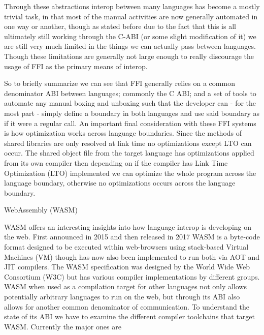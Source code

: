 Through these abstractions interop between many languages has become a mostly trivial task, in that most of the manual activities are now generally automated in one way or another, though as stated before due to the fact that this is all ultimately still working through the C-ABI (or some slight modification of it) we are still very much limited in the things we can actually pass between languages. Though these limitations are generally not large enough to really discourage the usage of FFI as the primary means of interop. 

So to briefly summarize we can see that FFI generally relies on a common denominator ABI between languages; commonly the C ABI; and a set of tools to automate any manual boxing and unboxing such that the developer can - for the most part - simply define a boundary in both languages and use said boundary as if it were a regular call. An important final consideration with these FFI systems is how optimization works across language boundaries. Since the methods of shared libraries are only resolved at link time no optimizations except LTO can occur. The shared object file from the target language has optimizations applied from its own compiler then depending on if the compiler has Link Time Optimization (LTO) implemented we can optimize the whole program across the language boundary, otherwise no optimizations occurs across the language boundary.

WebAssembly (WASM)

WASM offers an interesting insights into how language interop is developing on the web. First announced in 2015 and then released in 2017 WASM is a byte-code format designed to be executed within web-browsers using stack-based Virtual Machines (VM) though has now also been implemented to run both via AOT and JIT compilers. The WASM specification was designed by the World Wide Web Consortium (W3C) but has various compiler implementations by different groups.  WASM when used as a compilation target for other languages not only allows potentially arbitrary languages to run on the web, but through its ABI also allows for another common denominator of communication. To understand the state of its ABI we have to examine the different compiler toolchains that target WASM. Currently the major ones are 

